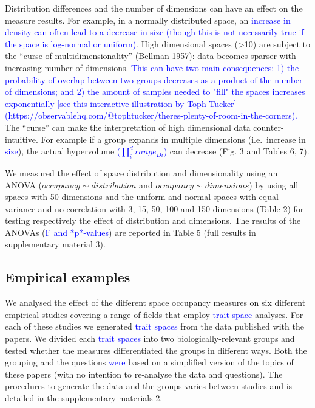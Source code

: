 \documentclass[]{article}
\begin{document}
Distribution differences and the number of dimensions can have an effect
on the measure results. For example, in a normally distributed space, an
\textcolor{blue}{increase in density can often lead to a decrease in size (though this is not necessarily true if the space is log-normal or uniform)}.
High dimensional spaces (\textgreater{}10) are subject to the ``curse of
multidimensionality'' (Bellman 1957): data becomes sparser with
increasing number of dimensions.
\textcolor{blue}{This can have two main consequences: 1) the probability of overlap between two groups decreases as a product of the number of dimensions; and 2) the amount of samples needed to "fill" the spaces increases exponentially [see this interactive illustration by Toph Tucker](https://observablehq.com/@tophtucker/theres-plenty-of-room-in-the-corners).}
The ``curse'' can make the interpretation of high dimensional data
counter-intuitive. For example if a group expands in multiple dimensions
(i.e.~increase in \textcolor{blue}{size}), the actual
hypervolume \textcolor{blue}{($\prod_{i}^{d} range_{Di}$)}
can decrease (Fig. 3 and Tables 6, 7).

We measured the effect of space distribution and dimensionality using an
ANOVA (\(occupancy \sim distribution\) and
\(occupancy \sim dimensions\)) by using all spaces with 50 dimensions
and the uniform and normal spaces with equal variance and no correlation
with 3, 15, 50, 100 and 150 dimensions (Table 2) for testing
respectively the effect of distribution and dimensions. The results of
the ANOVAs (\textcolor{blue}{F and *p*-values}) are reported
in Table 5 (full results in supplementary material 3).

\subsection{Empirical examples}\label{empirical-examples}

We analysed the effect of the different space occupancy measures on six
different empirical studies covering a range of fields that employ
\textcolor{blue}{trait space} analyses. For each of these
studies we generated \textcolor{blue}{trait spaces} from the
data published with the papers. We divided each
\textcolor{blue}{trait spaces} into two
biologically-relevant groups and tested whether the measures
differentiated the groups in different ways. Both the grouping and the
questions \textcolor{blue}{were} based on a simplified
version of the topics of these papers (with no intention to re-analyse
the data and questions). The procedures to generate the data and the
groups varies between studies and is detailed in the supplementary
materials 2.
\end{document}
